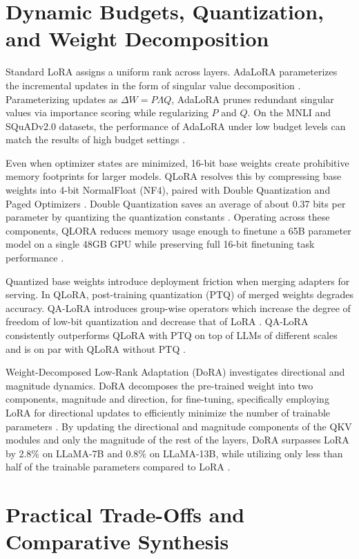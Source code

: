\documentclass[11pt,a4paper]{article}
\begin{document}
\section{Dynamic Budgets, Quantization, and Weight Decomposition}

Standard LoRA assigns a uniform rank across layers. AdaLoRA parameterizes the incremental updates in the form of singular value decomposition \cite{zhang2023adalora}. Parameterizing updates as $\Delta W = P \Lambda Q$, AdaLoRA prunes redundant singular values via importance scoring while regularizing $P$ and $Q$. On the MNLI and SQuADv2.0 datasets, the performance of AdaLoRA under low budget levels can match the results of high budget settings \cite{zhang2023adalora}.

Even when optimizer states are minimized, 16-bit base weights create prohibitive memory footprints for larger models. QLoRA resolves this by compressing base weights into 4-bit NormalFloat (NF4), paired with Double Quantization and Paged Optimizers \cite{dettmers2023qlora}. Double Quantization saves an average of about 0.37 bits per parameter by quantizing the quantization constants \cite{dettmers2023qlora}. Operating across these components, QLORA reduces memory usage enough to finetune a 65B parameter model on a single 48GB GPU while preserving full 16-bit finetuning task performance \cite{dettmers2023qlora}.

Quantized base weights introduce deployment friction when merging adapters for serving. In QLoRA, post-training quantization (PTQ) of merged weights degrades accuracy. QA-LoRA introduces group-wise operators which increase the degree of freedom of low-bit quantization and decrease that of LoRA \cite{xu2023qa}. QA-LoRA consistently outperforms QLoRA with PTQ on top of LLMs of different scales and is on par with QLoRA without PTQ \cite{xu2023qa}.

Weight-Decomposed Low-Rank Adaptation (DoRA) investigates directional and magnitude dynamics. DoRA decomposes the pre-trained weight into two components, magnitude and direction, for fine-tuning, specifically employing LoRA for directional updates to efficiently minimize the number of trainable parameters \cite{liu2024dora}. By updating the directional and magnitude components of the QKV modules and only the magnitude of the rest of the layers, DoRA surpasses LoRA by 2.8\% on LLaMA-7B and 0.8\% on LLaMA-13B, while utilizing only less than half of the trainable parameters compared to LoRA \cite{liu2024dora}.

\section{Practical Trade-Offs and Comparative Synthesis}
\end{document}
